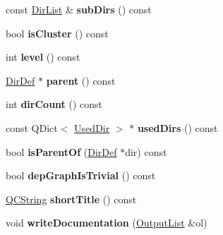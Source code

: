 \begin{DoxyCompactItemize}
\item 
\hypertarget{class_dir_def_a17cde499205d91b455284cd37758a8cb}{const \hyperlink{class_dir_list}{Dir\-List} \& {\bfseries sub\-Dirs} () const }\label{class_dir_def_a17cde499205d91b455284cd37758a8cb}

\item 
\hypertarget{class_dir_def_a4e82b08f079de43b46df0a4c6e48d5a2}{bool {\bfseries is\-Cluster} () const }\label{class_dir_def_a4e82b08f079de43b46df0a4c6e48d5a2}

\item 
\hypertarget{class_dir_def_a82c2056cb8c65be6ecfc66a160eb3c0f}{int {\bfseries level} () const }\label{class_dir_def_a82c2056cb8c65be6ecfc66a160eb3c0f}

\item 
\hypertarget{class_dir_def_ac83d5b0439aa42dcfced369c80347e6a}{\hyperlink{class_dir_def}{Dir\-Def} $\ast$ {\bfseries parent} () const }\label{class_dir_def_ac83d5b0439aa42dcfced369c80347e6a}

\item 
\hypertarget{class_dir_def_a9af75ec49f33783104fee0d855b4ddae}{int {\bfseries dir\-Count} () const }\label{class_dir_def_a9af75ec49f33783104fee0d855b4ddae}

\item 
\hypertarget{class_dir_def_a0318344ef012bc0f50b92202302cad22}{const Q\-Dict$<$ \hyperlink{class_used_dir}{Used\-Dir} $>$ $\ast$ {\bfseries used\-Dirs} () const }\label{class_dir_def_a0318344ef012bc0f50b92202302cad22}

\item 
\hypertarget{class_dir_def_ab3752c7015e92ded6a7faae1bb76b8b8}{bool {\bfseries is\-Parent\-Of} (\hyperlink{class_dir_def}{Dir\-Def} $\ast$dir) const }\label{class_dir_def_ab3752c7015e92ded6a7faae1bb76b8b8}

\item 
\hypertarget{class_dir_def_a5ffe3359a147cba31cb95fd8cff44815}{bool {\bfseries dep\-Graph\-Is\-Trivial} () const }\label{class_dir_def_a5ffe3359a147cba31cb95fd8cff44815}

\item 
\hypertarget{class_dir_def_af02d9e727efec6ebc3cc446b249d8fa2}{\hyperlink{class_q_c_string}{Q\-C\-String} {\bfseries short\-Title} () const }\label{class_dir_def_af02d9e727efec6ebc3cc446b249d8fa2}

\item 
\hypertarget{class_dir_def_a0c85f3695c99f7b1aeb762bbdabc8d62}{void {\bfseries write\-Documentation} (\hyperlink{class_output_list}{Output\-List} \&ol)}\label{class_dir_def_a0c85f3695c99f7b1aeb762bbdabc8d62}


\end{DoxyCompactItemize}
